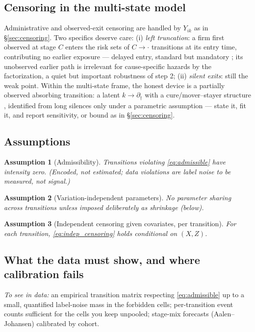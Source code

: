 \documentclass[11pt]{article}
\newtheorem{assumption}{Assumption}
\numberwithin{assumption}{section}
\numberwithin{proposition}{section}
\numberwithin{remark}{section}
\begin{document}
\subsection{Censoring in the multi-state model}
Administrative and observed-exit censoring are handled by
$Y_{ik}$ as in \S\ref{sec:censoring}. Two specifics deserve care:
(i) \emph{left truncation}: a firm first observed at stage $C$ enters the
risk sets of $C\to\cdot$ transitions at its entry time, contributing no
earlier exposure --- delayed entry, standard but mandatory
\citep{kalbfleisch2002}; its unobserved earlier path is irrelevant for
cause-specific hazards by the factorization, a quiet but important
robustness of step 2;
(ii) \emph{silent exits}: still the weak point. Within the multi-state
frame, the honest device is a partially observed absorbing transition: a
latent $k\to\partial_\dagger$ with a cure/mover--stayer structure
\citep{farewell1982}, identified from long silences only under a parametric
assumption --- state it, fit it, and report sensitivity, or bound as in
\S\ref{sec:censoring}.

\subsection{Assumptions}
\begin{assumption}[Admissibility]\label{as:msm_dag}
Transitions violating \eqref{eq:admissible} have intensity zero. (Encoded,
not estimated; data violations are label noise to be measured, not signal.)
\end{assumption}
\begin{assumption}[Variation-independent parameters]\label{as:msm_sep}
No parameter sharing across transitions unless imposed deliberately as
shrinkage (below).
\end{assumption}
\begin{assumption}[Independent censoring given covariates, per
transition]\label{as:msm_cens}
For each transition, \eqref{eq:indep_censoring} holds conditional on
$(X,Z)$.
\end{assumption}

\subsection{What the data must show, and where calibration fails}
\emph{To see in data:} an empirical transition matrix respecting
\eqref{eq:admissible} up to a small, quantified label-noise mass in the
forbidden cells; per-transition event counts sufficient for the cells you
keep unpooled; stage-mix forecasts (Aalen--Johansen) calibrated by cohort.
\end{document}
